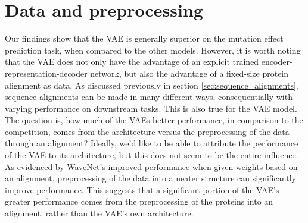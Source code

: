 

\section{Data and preprocessing}
\label{discussion:data}
Our findings show that the VAE is generally superior on the mutation effect prediction task, when compared to the other models. However, it is worth noting that the VAE does not only have the advantage of an explicit trained encoder-representation-decoder network, but also the advantage of a fixed-size protein alignment as data. As discussed previously in section \ref{sec:sequence_alignments}, sequence alignments can be made in many different ways, consequentially with varying performance on downstream tasks. This is also true for the VAE model. The question is, how much of the VAEs better performance, in comparison to the competition, comes from the architecture versus the preprocessing of the data through an alignment? Ideally, we'd like to be able to attribute the performance of the VAE to its architecture, but this does not seem to be the entire influence. As evidenced by WaveNet's improved performance when given weights based on an alignment, preprocessing of the data into a neater structure can significantly improve performance. This suggests that a significant portion of the VAE's greater performance comes from the preprocessing of the proteins into an alignment, rather than the VAE's own architecture. %

